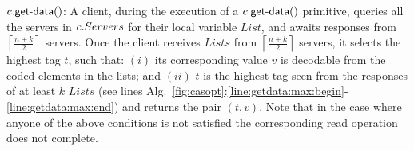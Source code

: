 	$\dagetdata{c}$:	A  client, during the execution of a  $\dagetdata{c}$ primitive, queries all the servers in $c.Servers$ for their  local variable $List$, and awaits responses from $\left\lceil \frac{n+k}{2} \right\rceil$ servers. Once the client receives $Lists$ from $\left\lceil \frac{n+k}{2} \right\rceil$ servers,  it selects the highest  tag $t$, such that: $(i)$ its corresponding value $v$ is decodable from the coded elements in the lists; and $(ii)$ $t$ is the highest tag seen from the responses of at least $k$ $Lists$ 
			(see lines Alg.~\ref{fig:casopt}:\ref{line:getdata:max:begin}-\ref{line:getdata:max:end}) and returns the pair $(t, v)$. 
Note that in the case where anyone of the above conditions is not satisfied the corresponding read operation does not complete.
%
%
%

